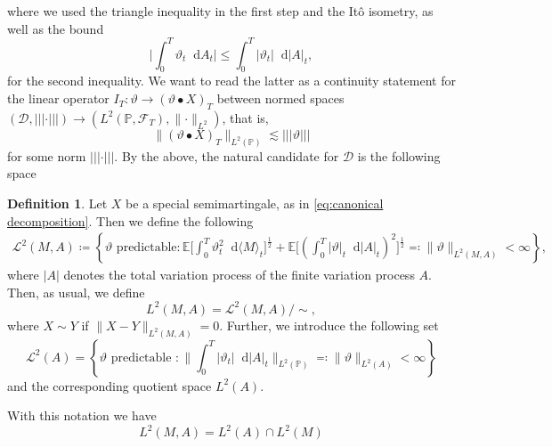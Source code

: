 \documentclass[11pt,a4paper,twoside,openany]{report}
\newcommand{\diff}{\mathop{}\!\mathrm{d}}
\theoremstyle{plain} %
\theoremstyle{definition} %
\newtheorem{definition}[definition]{Definition}
\theoremstyle{remark} %
\begin{document}
where we used the triangle inequality in the first step and the Itô isometry, as well as the bound
\begin{equation}
    \bigg|\int_0^{T}\vartheta_t\diff A_t\bigg|\leq \int_0^{T}|\vartheta_t|\diff |A|_t,
\end{equation} 
for the second inequality. We want to read the latter as a continuity statement for the linear operator \(I_T:\vartheta\to (\vartheta\bullet X)_{T}\) between normed spaces \( (\mathcal{D},\left\lvert\!\left\lvert\!\left\lvert \cdot\right\rvert\!\right\rvert\!\right\rvert)\to(L^2(\mathbb{P},\mathcal{F}_{T}),\lVert\cdot\rVert_{L^2})\), that is,
\begin{equation}
    \lVert (\vartheta\bullet X)_{T}\rVert_{L^2(\mathbb{P})}\lesssim \left\lvert\!\left\lvert\!\left\lvert \vartheta\right\rvert\!\right\rvert\!\right\rvert
\end{equation}
for some norm \(\left\lvert\!\left\lvert\!\left\lvert \cdot\right\rvert\!\right\rvert\!\right\rvert\). By the above, the natural candidate for \(\mathcal{D}\) is the following space
\begin{definition}\label{def:L2MA}
Let \(X\) be a special semimartingale, as in \cref{eq:canonical decomposition}. Then we define the following
\begin{align*}
     \mathcal{L}^2(M,A)\coloneqq\left\{\vartheta \text{ predictable}:\mathbb{E}\bigg[\int_0^T \vartheta_t^2\diff \langle M\rangle_t\bigg]^{\frac{1}{2}}+\mathbb{E}\bigg[\left(\int_0^T |\vartheta|_t\diff |A|_t\right)^2\bigg]^{\frac{1}{2}}\eqqcolon\lVert \vartheta\rVert_{L^2(M,A)}<\infty\right\},
\end{align*}
    where \(|A|\) denotes the total variation process of the finite variation process \(A\). 
    Then, as usual, we define 
    \begin{equation}
        L^2(M,A)=\mathcal{L}^2(M,A)/\sim,
    \end{equation}
    where \(X\sim Y\) if \(\lVert X-Y\rVert_{L^2(M,A)}=0\). 
    Further, we introduce the following set
 \begin{equation}
        \mathcal{L}^2(A)=\left\{\vartheta \text{ predictable }:\lVert\int_{0}^{T}|\vartheta_t|\diff |A|_t\rVert_{L^2(\mathbb{P})}\eqqcolon\lVert \vartheta\rVert_{L^2(A)}<\infty\right\}
   \end{equation}
    and the corresponding quotient space \(L^2(A)\).
\end{definition}
With this notation we have
\begin{equation}
    L^2(M,A)=L^2(A)\cap L^2(M)
\end{equation}
\end{document}
